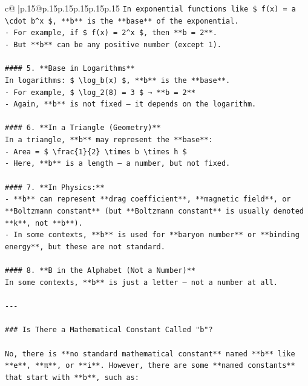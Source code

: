 \documentclass{article}
\begin{document}
{\begin{supertabular}{c@{$\;$}|p{.15\linewidth}@{}p{.15\linewidth}p{.15\linewidth}p{.15\linewidth}p{.15\linewidth}p{.15\linewidth}}
{{{\texttt{In exponential functions like \$ f(x) = a \textbackslash{}cdot b\^{}x \$, **b** is the **base** of the exponential.} \\
\texttt{{-} For example, if \$ f(x) = 2\^{}x \$, then **b = 2**.} \\
\texttt{{-} But **b** can be any positive number (except 1).} \\
\\ 
\texttt{\#\#\#\# 5. **Base in Logarithms**} \\
\texttt{In logarithms: \$ \textbackslash{}log\_b(x) \$, **b** is the **base**.} \\
\texttt{{-} For example, \$ \textbackslash{}log\_2(8) = 3 \$ → **b = 2**} \\
\texttt{{-} Again, **b** is not fixed — it depends on the logarithm.} \\
\\ 
\texttt{\#\#\#\# 6. **In a Triangle (Geometry)**} \\
\texttt{In a triangle, **b** may represent the **base**:} \\
\texttt{{-} Area = \$ \textbackslash{}frac\{1\}\{2\} \textbackslash{}times b \textbackslash{}times h \$} \\
\texttt{{-} Here, **b** is a length — a number, but not fixed.} \\
\\ 
\texttt{\#\#\#\# 7. **In Physics:**} \\
\texttt{{-} **b** can represent **drag coefficient**, **magnetic field**, or **Boltzmann constant** (but **Boltzmann constant** is usually denoted **k**, not **b**).} \\
\texttt{{-} In some contexts, **b** is used for **baryon number** or **binding energy**, but these are not standard.} \\
\\ 
\texttt{\#\#\#\# 8. **B in the Alphabet (Not a Number)**} \\
\texttt{In some contexts, **b** is just a letter — not a number at all.} \\
\\ 
\texttt{{-}{-}{-}} \\
\\ 
\texttt{\#\#\# Is There a Mathematical Constant Called "b"?} \\
\\ 
\texttt{No, there is **no standard mathematical constant** named **b** like **e**, **π**, or **i**. However, there are some **named constants** that start with **b**, such as:} \\
}}}
\end{supertabular}}
\end{document}
